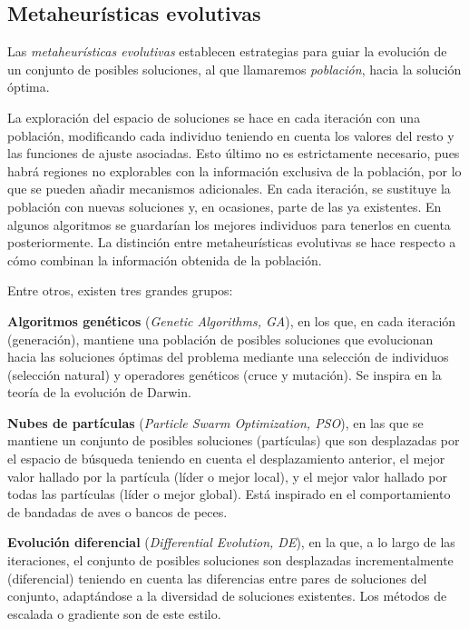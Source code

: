 \subsection{Metaheurísticas evolutivas}
Las {\sl metaheurísticas evolutivas} establecen estrategias para guiar la evolución de un conjunto de posibles soluciones, al que llamaremos {\sl población}, hacia la solución óptima.

La exploración del espacio de soluciones se hace en cada iteración con una población, modificando cada individuo teniendo en cuenta los valores del resto y las funciones de ajuste asociadas. Esto último no es estrictamente necesario, pues habrá regiones no explorables con la información exclusiva de la población, por lo que se pueden añadir mecanismos adicionales. En cada iteración, se sustituye la población con nuevas soluciones y, en ocasiones, parte de las ya existentes. En algunos algoritmos se guardarían los mejores individuos para tenerlos en cuenta posteriormente. La distinción entre metaheurísticas evolutivas se hace respecto a cómo combinan la información obtenida de la población.

Entre otros, existen tres grandes grupos:

{\bf Algoritmos genéticos} (\textit{Genetic Algorithms, GA}), en los que, en cada iteración (generación), mantiene una población de posibles soluciones que evolucionan hacia las soluciones óptimas del problema mediante una selección de individuos (selección natural) y operadores genéticos (cruce y mutación). Se inspira en la teoría de la evolución de Darwin.

{\bf Nubes de partículas} (\textit{Particle Swarm Optimization, PSO}), en las que se mantiene un conjunto de posibles soluciones (partículas) que son desplazadas por el espacio de búsqueda teniendo en cuenta el desplazamiento anterior, el mejor valor hallado por la partícula (líder o mejor local), y el mejor valor hallado por todas las partículas (líder o mejor global). Está inspirado en el comportamiento de bandadas de aves o bancos de peces.

{\bf Evolución diferencial} (\textit{Differential Evolution, DE}), en la que, a lo largo de las iteraciones, el conjunto de posibles soluciones son desplazadas incrementalmente (diferencial) teniendo en cuenta las diferencias entre pares de soluciones del conjunto, adaptándose a la diversidad de soluciones existentes. Los métodos de escalada o gradiente son de este estilo.





